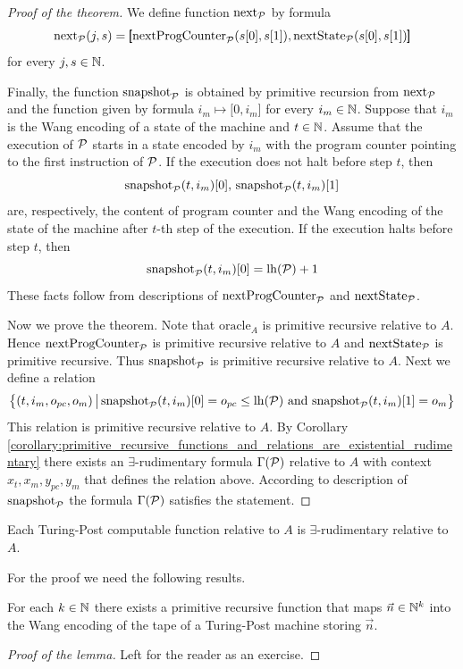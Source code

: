 \documentclass[10pt]{amsart}
\begin{document}
\begin{proof}[Proof of the theorem]
	We define function $\mathrm{next}_{{\mathcal P}}$ by formula
	$$\mathrm{next}_{{\mathcal P}}(j, s) = \pmb{[}\mathrm{nextProgCounter}_{{\mathcal P}}(s[0], s[1]),\mathrm{nextState}_{{\mathcal P}}(s[0], s[1])\pmb{]}$$
	for every $j,s\in {\mathbb N}$.

	Finally, the function $\mathrm{snapshot}_{{\mathcal P}}$ is obtained by primitive recursion from $\mathrm{next}_{{\mathcal P}}$ and the function given by formula $i_m \mapsto \pmb{[}0,i_m\pmb{]}$ for every $i_m \in {\mathbb N}$. Suppose that $i_m$ is the Wang encoding of a state of the machine and $t \in {\mathbb N}$. Assume that the execution of ${\mathcal P}$ starts in a state encoded by $i_m$ with the program counter pointing to the first instruction of ${\mathcal P}$. If the execution does not halt before step $t$, then
	$$\mathrm{snapshot}_{{\mathcal P}}(t,i_m)[0],\,\mathrm{snapshot}_{{\mathcal P}}(t,i_m)[1]$$
	are, respectively, the content of program counter and the Wang encoding of the state of the machine after $t$-th step of the execution. If the execution halts before step $t$, then
	$$\mathrm{snapshot}_{{\mathcal P}}(t,i_m)[0] = \mathrm{lh}({\mathcal P}) + 1$$
	These facts follow from descriptions of $\mathrm{nextProgCounter}_{{\mathcal P}}$ and $\mathrm{nextState}_{{\mathcal P}}$.

	Now we prove the theorem. Note that $\mathrm{oracle}_A$ is primitive recursive relative to $A$. Hence $\mathrm{nextProgCounter}_{{\mathcal P}}$ is primitive recursive relative to $A$ and $\mathrm{nextState}_{{\mathcal P}}$ is primitive recursive. Thus $\mathrm{snapshot}_{{\mathcal P}}$ is primitive recursive relative to $A$. Next we define a relation
	$$\big\{(t,i_m,o_{pc},o_m)\,\big|\,\mathrm{snapshot}_{{\mathcal P}}(t,i_m)[0] = o_{pc} \leq \mathrm{lh}({\mathcal P})\mbox{ and }\mathrm{snapshot}_{{\mathcal P}}(t,i_m)[1] = o_m\big\}$$
	This relation is primitive recursive relative to $A$. By Corollary \ref{corollary:primitive_recursive_functions_and_relations_are_existential_rudimentary} there exists an $\exists$-rudimentary formula $\Gamma({\mathcal P})$ relative to $A$ with context $x_t,x_m,y_{pc},y_m$ that defines the relation above. According to description of $\mathrm{snapshot}_{{\mathcal P}}$ the formula $\Gamma({\mathcal P})$ satisfies the statement.
\end{proof}

\begin{theorem}\label{theorem:each_Turing_Post_computable_function_is_existential_rudimentary}
	Each Turing-Post computable function relative to $A$ is $\exists$-rudimentary relative to $A$.
\end{theorem}
\noindent
For the proof we need the following results.

\begin{lemma}\label{lemma:Wang_encoding_is_primitive_recursive}
	For each $k \in {\mathbb N}$ there exists a primitive recursive function that maps $\vec{n} \in {\mathbb N}^k$ into the Wang encoding of the tape of a Turing-Post machine storing $\vec{n}$.
\end{lemma}
\begin{proof}[Proof of the lemma]
	Left for the reader as an exercise.
\end{proof}
\end{document}
